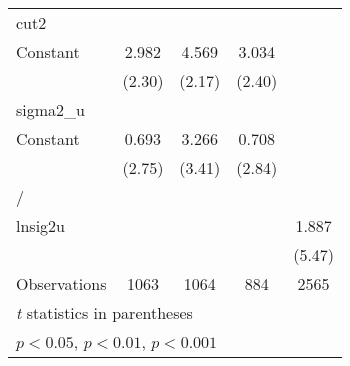 {\begin{longtable}{l*{4}{c}}
\hline
cut2            &                  &                  &                  &                  \\
Constant        &    2.982\sym{*}  &    4.569\sym{*}  &    3.034\sym{*}  &                  \\
                &   (2.30)         &   (2.17)         &   (2.40)         &                  \\
\hline
sigma2\_u        &                  &                  &                  &                  \\
Constant        &    0.693\sym{**} &    3.266\sym{***}&    0.708\sym{**} &                  \\
                &   (2.75)         &   (3.41)         &   (2.84)         &                  \\
\hline
/               &                  &                  &                  &                  \\
lnsig2u         &                  &                  &                  &    1.887\sym{***}\\
                &                  &                  &                  &   (5.47)         \\
\hline
Observations    &     1063         &     1064         &      884         &     2565         \\
\hline\hline
\multicolumn{5}{l}{\footnotesize \textit{t} statistics in parentheses}\\
\multicolumn{5}{l}{\footnotesize \sym{*} \(p<0.05\), \sym{**} \(p<0.01\), \sym{***} \(p<0.001\)}\\
\end{longtable}
}
